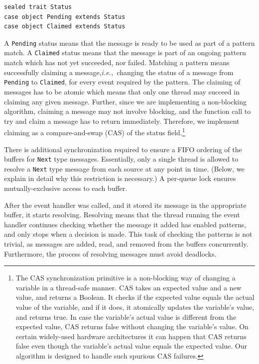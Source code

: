 \documentclass[runningheads]{llncs}
\newcommand{\ie}{{\em i.e.,~}}
\begin{document}
\begin{sloppypar}
\begin{lstlisting}[caption={Message status implemented using \texttt{objects}. Scala natively supports singletons~\cite{Gamma:1994} (\texttt{object}s).}]
sealed trait Status
case object Pending extends Status
case object Claimed extends Status
\end{lstlisting}

A \texttt{Pending} status means that the message is ready to be used as part
of a pattern match. A \texttt{Claimed} status means that the message is part
of an ongoing pattern match which has not yet succeeded, nor failed. Matching
a pattern means successfully claiming a message,\ie changing the status of a
message from \texttt{Pending} to \texttt{Claimed}, for every event
required by the pattern. The claiming of messages has to be atomic which means
that only one thread may succeed in claiming any given message. Further, since
we are implementing a non-blocking algorithm, claiming a message may not
involve blocking, and the function call to try and claim a message has to
return immediately. Therefore, we implement claiming as a compare-and-swap
(CAS) of the status field.\footnote{The CAS synchronization primitive is a
non-blocking way of changing a variable in a thread-safe manner. CAS takes an
expected value and a new value, and returns a Boolean. It checks if the
expected value equals the actual value of the variable, and if it does, it
atomically updates the variable's value, and returns true. In case the
variable's actual value is different from the expected value, CAS returns
false without changing the variable's value. On certain widely-used hardware
architectures it can happen that CAS returns false even though the variable's
actual value equals the expected value. Our algorithm is designed to handle
such spurious CAS failures.}

There is additional synchronization required to ensure a FIFO ordering of the
buffers for \texttt{Next} type messages. Essentially, only a single thread is
allowed to resolve a \texttt{Next} type message from each source at any point
in time. (Below, we explain in detail why this restriction is necessary.)
A per-queue lock ensures mutually-exclusive access to each buffer.

After the event handler was called, and it stored its message in the
appropriate buffer, it starts resolving. Resolving means that the thread
running the event handler continues checking whether the message it added has
enabled patterns, and only stops when a decision is made. This task of
checking the patterns is not trivial, as messages are added, read, and removed
from the buffers concurrently. Furthermore, the process of resolving messages
must avoid deadlocks.


\end{sloppypar}
\end{document}
